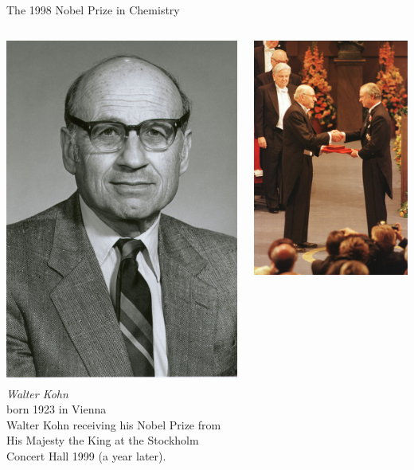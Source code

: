 \documentclass[noamsthm,8pt,t,xcolor={dvipsnames}]{beamer}
\begin{document}
\begin{frame}{The 1998 Nobel Prize in Chemistry}
   \begin{columns}
      \begin{column}{0.5\textwidth}
         \begin{center}
            \includegraphics[width=0.5\linewidth]{figures/kohn.jpg}\\
            \emph{Walter Kohn}\\
            born 1923 in Vienna\\
            \vspace{0.5cm} 
            Walter Kohn receiving his Nobel Prize from His Majesty the King at the Stockholm Concert Hall 1999 (a year later).
         \end{center}
      \end{column}
      \begin{column}{0.5\textwidth}
         \begin{center}
            \includegraphics[width=0.7\linewidth]{figures/kohnkungen.jpg}

\end{center}
\end{column}
\end{columns}
\end{frame}
\end{document}
